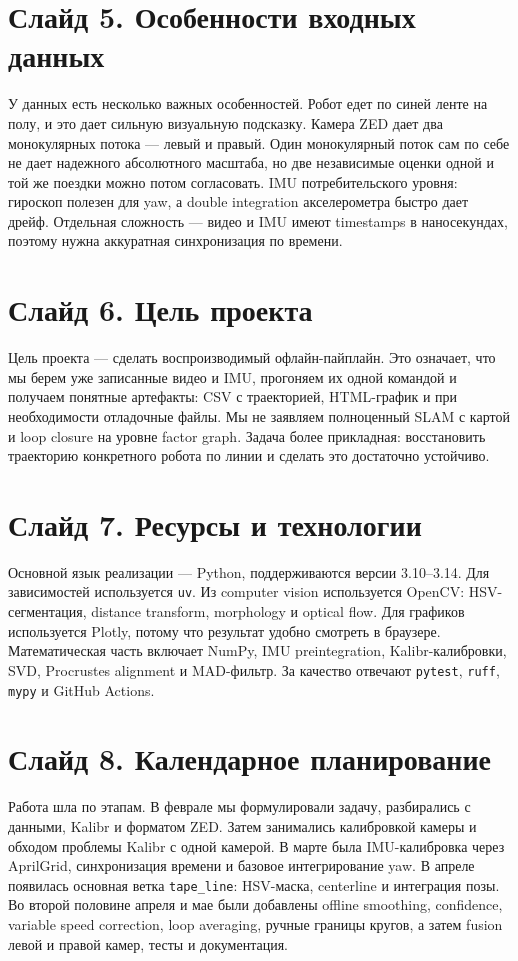 \documentclass[12pt,a4paper]{article}
\newcommand{\code}[1]{\texttt{#1}}
\begin{document}
\section*{Слайд 5. Особенности входных данных}

У данных есть несколько важных особенностей. Робот едет по синей ленте на полу, и это дает сильную визуальную подсказку. Камера ZED дает два монокулярных потока --- левый и правый. Один монокулярный поток сам по себе не дает надежного абсолютного масштаба, но две независимые оценки одной и той же поездки можно потом согласовать. IMU потребительского уровня: гироскоп полезен для yaw, а double integration акселерометра быстро дает дрейф. Отдельная сложность --- видео и IMU имеют timestamps в наносекундах, поэтому нужна аккуратная синхронизация по времени.

\section*{Слайд 6. Цель проекта}

Цель проекта --- сделать воспроизводимый офлайн-пайплайн. Это означает, что мы берем уже записанные видео и IMU, прогоняем их одной командой и получаем понятные артефакты: CSV с траекторией, HTML-график и при необходимости отладочные файлы. Мы не заявляем полноценный SLAM с картой и loop closure на уровне factor graph. Задача более прикладная: восстановить траекторию конкретного робота по линии и сделать это достаточно устойчиво.

\section*{Слайд 7. Ресурсы и технологии}

Основной язык реализации --- Python, поддерживаются версии 3.10--3.14. Для зависимостей используется \code{uv}. Из computer vision используется OpenCV: HSV-сегментация, distance transform, morphology и optical flow. Для графиков используется Plotly, потому что результат удобно смотреть в браузере. Математическая часть включает NumPy, IMU preintegration, Kalibr-калибровки, SVD, Procrustes alignment и MAD-фильтр. За качество отвечают \code{pytest}, \code{ruff}, \code{mypy} и GitHub Actions.

\section*{Слайд 8. Календарное планирование}

Работа шла по этапам. В феврале мы формулировали задачу, разбирались с данными, Kalibr и форматом ZED. Затем занимались калибровкой камеры и обходом проблемы Kalibr с одной камерой. В марте была IMU-калибровка через AprilGrid, синхронизация времени и базовое интегрирование yaw. В апреле появилась основная ветка \code{tape\_line}: HSV-маска, centerline и интеграция позы. Во второй половине апреля и мае были добавлены offline smoothing, confidence, variable speed correction, loop averaging, ручные границы кругов, а затем fusion левой и правой камер, тесты и документация.
\end{document}
